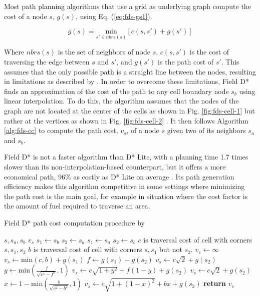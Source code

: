 Most path planning algorithms that use a grid as underlying graph compute the cost of a node $s$, $g(s)$, using 
Eq. (\ref{eq:fds-gs1}).

\begin{equation}
	g(s) = \underset{s' \in nbrs(s)}{\mathrm{min}} [c(s,s') + g(s')]
	\label{eq:fds-gs1}
\end{equation}

Where $nbrs(s)$ is the set of neighbors of node $s$, $c(s,s')$ is the cost of traversing the edge between $s$ and
$s'$, and $g(s')$ is the path cost of $s'$. This assumes that the only possible path is a straight line between
the nodes, resulting in limitations as described by \autocite{DF06}. In order to overcome these limitations,
Field D* finds an approximation of the cost of the path to any cell boundary node $s_b$ using linear interpolation.
To do this, the algorithm assumes that the nodes of the graph are not located at the center of the cells as shown in Fig. \ref{fig:fds-cell-1} but rather
at the vertices as shown in Fig. \ref{fig:fds-cell-2} \autocite{DF06}. It then follows Algorithm \ref{alg:fds-cc} to compute the path cost, $v_s$, of a node $s$ given
two of its neighbors $s_a$ and $s_b$.

Field D* is not a faster algorithm than D* Lite, with a planning time 1.7 times slower than its non-interpolation-based counterpart, 
but it offers a more economical path, $96\%$ as costly as D* Lite on average \autocite{DF06}. Its path generation efficiency makes
this algorithm competitive in some settings where minimizing the path cost is the main goal, for example in situation where the 
cost factor is the amount of fuel required to traverse an area.

\begin{algorithm}
	\algrenewcommand{}
	\algrenewcommand{}
	\caption{Field D* path cost computation procedure by \autocite{DF06}}\label{alg:fds-cc}
	\begin{algorithmic}[1]
		\Require $s, s_a, s_b$
		\Ensure $v_s$ 
		\State $s_1 \gets s_b$ 
		\State $s_2 \gets s_a$
		\Else
		\State $s_1 \gets s_a$ 
		\State $s_2 \gets s_b$ 
		\EndIf
		\State $c$ is traversal cost of cell with corners $s, s_1, s_2$ 
		\State $b$ is traversal cost of cell with corners $s, s_1$ but not $s_2$.
		\State $v_s \gets \infty$
		\State $v_s \gets \mathrm{min}(c,b) + g(s_1)$
		\Else
		\State $f \gets g(s_1) - g(s_2)$ 
		\State $v_s \gets c \sqrt{2} + g(s_2)$
		\Else
		\State $y \gets \mathrm{min}\left(\frac{f}{\sqrt{c^s - f^s}}, 1\right)$
		\State $v_s \gets c \sqrt{1 + y^2} + f(1 - y) + g(s_2)$
		\EndIf
		\Else
		\State $v_s \gets c \sqrt{2} + g(s_2)$
		\Else 
		\State $x \gets 1 - \mathrm{min}\left(\frac{b}{\sqrt{c^2 - b^2}},1\right)$
		\State $v_s \gets c \sqrt{1 + (1-x)^2} + bx + g(s_2)$
		\EndIf
		\EndIf
		\EndIf
		\State \textbf{return} $v_s$
	\end{algorithmic}
\end{algorithm}

